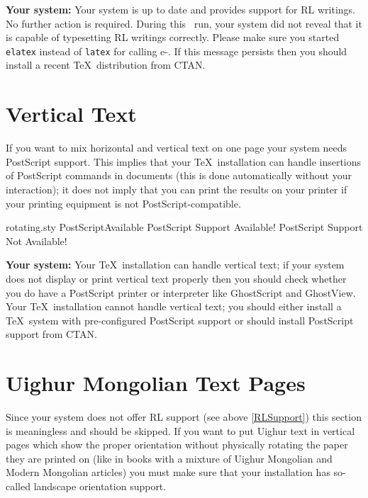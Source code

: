 \documentclass[11pt,a4paper]{article}
\begin{document}
\textbf{Your system:}
\ifnum{}
	Your system is up to date and provides support for RL writings.
	No further action is required.
\else
	During this \LaTeXe\ run, your system did not reveal that it is
	capable of typesetting RL writings correctly. Please make sure
	\marginpar{\huge!!!}
	you started \texttt{elatex} instead of \texttt{latex} for calling
	e-\LaTeXe. If this message persists then you should install a
	recent \TeX\ distribution from CTAN.
\fi


\section{Vertical Text\label{VerticalText}}

If you want to mix horizontal and vertical text on one page your
system needs PostScript support. This implies that your \TeX\ 
installation can handle insertions of PostScript commands in
documents (this is done automatically without your interaction);
it does not imply that you can print the results on your printer
if your printing equipment is not PostScript-compatible.

\PackageDiagnostics%
	{rotating.sty}				%
	{PostScriptAvailable}			%
	{PostScript Support Available!}		%
	{PostScript Support Not Available!}	%
	
\textbf{Your system:}
\ifnum{}
	Your \TeX\ installation can handle vertical text; if your
	system does not display or print vertical text properly
	then you should check whether you do have a PostScript
	printer or interpreter like GhostScript and GhostView.
\else
	Your \TeX\ installation cannot handle vertical text;
	you should either install a \TeX\ system with pre-configured
	\marginpar{\huge!!!}
	PostScript support or should install PostScript support
	from CTAN.
\fi
%

\section{Uighur Mongolian Text Pages}

\ifnum{}
	Since your system does not offer RL support (see above
	\ref{RLSupport}) this section is meaningless and should
	be skipped.
\else
	If you want to put Uighur text in vertical pages which
	show the proper orientation without physically rotating
	the paper they are printed on (like in books with a
	mixture of Uighur Mongolian and Modern Mongolian articles)
	you must make sure that your installation has so-called
	landscape orientation support.
\end{document}
